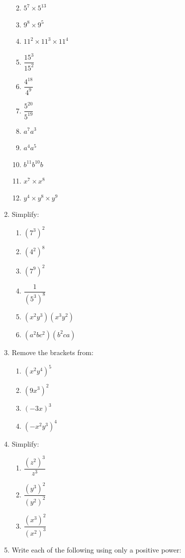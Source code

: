 \documentclass[
  12pt,
  oneside]{book}
\providecommand{\tightlist}{%
  \setlength{\itemsep}{0pt}\setlength{\parskip}{0pt}}
\theoremstyle{definition}
\theoremstyle{definition}
\theoremstyle{definition}
\theoremstyle{definition}
\theoremstyle{remark}
\begin{document}
\begin{enumerate}
  \begin{enumerate}
  \def\labelenumii{\alph{enumii})}
  \tightlist
  \item
    \(5^7\times 5^{13}\)
  \item
    \(9^8\times 9^5\)
  \item
    \(11^2\times11^3\times11^4\)
  \item
    \(\dfrac{15^3}{15^2}\)
  \item
    \(\dfrac{4^{18}}{4^9}\)
  \item
    \(\dfrac{5^{20}}{5^{19}}\)
  \item
    \(a^7a^3\)
  \item
    \(a^4a^5\)
  \item
    \(b^{11}b^{10}b\)
  \item
    \(x^{7}\times x^{8}\)
  \item
    \(y^4\times y^8\times y^9\)
  \end{enumerate}
\item
  Simplify:

  \begin{enumerate}
  \def\labelenumii{\alph{enumii})}
  \tightlist
  \item
    \((7^3)^2\)
  \item
    \((4^2)^8\)
  \item
    \((7^9)^2\)
  \item
    \(\dfrac{1}{(5^3)^8}\)
  \item
    \((x^2y^3)(x^3y^2)\)
  \item
    \((a^2bc^2)(b^2ca)\)
  \end{enumerate}
\item
  Remove the brackets from:

  \begin{enumerate}
  \def\labelenumii{\alph{enumii})}
  \tightlist
  \item
    \((x^2y^4)^5\)
  \item
    \((9x^3)^2\)
  \item
    \((-3x)^3\)
  \item
    \((-x^2y^3)^4\)
  \end{enumerate}
\item
  Simplify:

  \begin{enumerate}
  \def\labelenumii{\alph{enumii})}
  \tightlist
  \item
    \(\dfrac{(z^2)^3}{z^3}\)
  \item
    \(\dfrac{(y^3)^2}{(y^2)^2}\)
  \item
    \(\dfrac{(x^3)^2}{(x^2)^3}\)
  \end{enumerate}
\item
  Write each of the following using only a positive power:


\end{enumerate}
\end{document}
